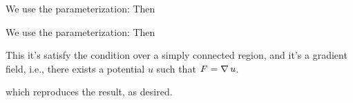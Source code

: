 \documentclass{article}
\begin{document}
{
\item[i)]
We use the parameterization:
Then
\item[ii)]
We use the parameterization:
Then
}
{
\item[i)]
This it's satisfy the condition over a simply connected region, and it's
a gradient field, i.e., there exists a potential $u$ such that $F=\nabla\,u$.
\item[ii)]
\item[iii)]
\item[iv)]
which reproduces the result, as desired.
}
\end{document}
